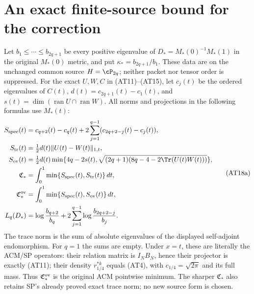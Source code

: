 \section{An exact finite-source bound for the correction}

Let $b_1\le\cdots\le b_{2q+1}$ be every positive eigenvalue of
$D_*=M_*(0)^{-1}M_*(1)$ in the original $M_*(0)$ metric, and put
$\kappa_*=b_{2q+1}/b_1$. These data are on the unchanged common
source $H=\cP_{2q}$; neither packet nor tensor order is suppressed.
For the exact $U,W,C$ in (AT11)--(AT15), let $c_j(t)$ be the
ordered eigenvalues of $C(t)$, $d(t)=c_{2q+1}(t)-c_1(t)$, and
$s(t)=\dim(\operatorname{ran}U\cap\operatorname{ran}W)$. All norms
and projections in the following formulas use $M_*(t)$:
\[
\begin{aligned}
S_{\rm spec}(t)&=c_{q+2}(t)-c_q(t)
 +2\sum_{j=1}^{q-1}(c_{2q+2-j}(t)-c_j(t)),\\
S_{\rm tr}(t)&=\tfrac12d(t)\|U(t)-W(t)\|_{1,t},\\
S_{\rm ov}(t)&=\tfrac12d(t)\min\{4q-2s(t),
 \sqrt{(2q+1)(8q-4-2\Tr(U(t)W(t)))}\},\\
\mathfrak C_*&=\int_0^1\min\{S_{\rm spec}(t),S_{\rm tr}(t)\}\,dt,\\
\mathfrak C_*^{\rm ov}&=\int_0^1\min\{S_{\rm spec}(t),S_{\rm ov}(t)\}\,dt,\\
L_q(D_*)&=\log\frac{b_{q+2}}{b_q}
 +2\sum_{j=1}^{q-1}\log\frac{b_{2q+2-j}}{b_j}.
\end{aligned}\tag{AT18a}
\]
The trace norm is the sum of absolute eigenvalues of the displayed
self-adjoint endomorphism. For $q=1$ the sums are empty. Under
$x=t$, these are literally the ACM/SP operators: their relation
matrix is $I_NB_N$, hence their projector is exactly (AT11);
their density $r_{1/4}^{*k}$ equals (AT4), with
$c_{1/4}=\sqrt{2\pi}$ and its full mass. Thus
$\mathfrak C_*^{\rm ov}$ is the original ACM pointwise minimum.
The sharper $\mathfrak C_*$ also retains SP's already proved exact
trace norm; no new source form is chosen.

